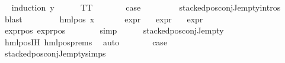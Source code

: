 \begin{isabellebody}
\ \ \isamarkupfalse%
{\isacharparenleft}{\kern0pt}induction\ y{\isacharparenright}{\kern0pt}\isanewline
\ \ \ \ \isamarkupfalse%
\ TT\isanewline
\ \ \ \ \isamarkupfalse%
\ \isamarkupfalse%
\ {\isacharquery}{\kern0pt}case\ \isanewline
\ \ \ \ \ \ \isamarkupfalse%
\ stacked{\isacharunderscore}{\kern0pt}pos{\isacharunderscore}{\kern0pt}conj{\isacharunderscore}{\kern0pt}J{\isacharunderscore}{\kern0pt}empty{\isachardot}{\kern0pt}intros{\isacharparenleft}{\kern0pt}{}{\isacharparenright}{\kern0pt}\ \isamarkupfalse%
\ blast\isanewline
\ \ \isamarkupfalse%
\isanewline
\ \ \ \ \isamarkupfalse%
\ {\isacharparenleft}{\kern0pt}hml{\isacharunderscore}{\kern0pt}pos\ x{}\ {\isasymchi}{\isacharparenright}{\kern0pt}\isanewline
\ \ \ \ \isamarkupfalse%
\ {\isachardoublequoteopen}expr{\isacharunderscore}{\kern0pt}{}\ {\isasymchi}\ {\isasymle}\ {}{\isachardoublequoteclose}\isanewline
{\isachardoublequoteopen}expr{\isacharunderscore}{\kern0pt}{}\ {\isasymchi}\ {\isasymle}\ {}{\isachardoublequoteclose}\isanewline
{\isachardoublequoteopen}expr{\isacharunderscore}{\kern0pt}{}\ {\isasymchi}\ {\isasymle}\ {}{\isachardoublequoteclose}\isanewline
\ \ \ \ \ \ \isamarkupfalse%
\ expr{\isacharunderscore}{\kern0pt}{}{\isacharunderscore}{\kern0pt}pos\ expr{\isacharunderscore}{\kern0pt}{}{\isacharunderscore}{\kern0pt}pos\isanewline
\ \ \ \ \ \ \isamarkupfalse%
\ simp{\isacharplus}{\kern0pt}\isanewline
\ \ \ \ \isamarkupfalse%
\ {\isachardoublequoteopen}stacked{\isacharunderscore}{\kern0pt}pos{\isacharunderscore}{\kern0pt}conj{\isacharunderscore}{\kern0pt}J{\isacharunderscore}{\kern0pt}empty\ {\isasymchi}{\isachardoublequoteclose}\isanewline
\ \ \ \ \ \ \isamarkupfalse%
\ hml{\isacharunderscore}{\kern0pt}pos{\isachardot}{\kern0pt}IH\ hml{\isacharunderscore}{\kern0pt}pos{\isachardot}{\kern0pt}prems{\isacharparenleft}{\kern0pt}{}{\isacharparenright}{\kern0pt}\ \isamarkupfalse%
\ auto\isanewline
\ \ \ \ \isamarkupfalse%
\ \isamarkupfalse%
\ {\isacharquery}{\kern0pt}case\ \isanewline
\ \ \ \ \ \ \isamarkupfalse%
\ stacked{\isacharunderscore}{\kern0pt}pos{\isacharunderscore}{\kern0pt}conj{\isacharunderscore}{\kern0pt}J{\isacharunderscore}{\kern0pt}empty{\isachardot}{\kern0pt}simps\ \isamarkupfalse%

\end{isabellebody}
